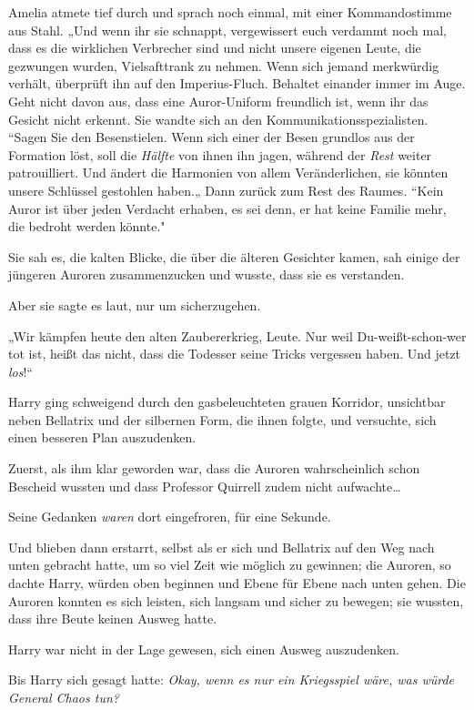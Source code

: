 {Amelia atmete tief durch und sprach noch einmal, mit einer Kommandostimme aus Stahl. „Und wenn ihr sie schnappt, vergewissert euch verdammt noch mal, dass es die wirklichen Verbrecher sind und nicht unsere eigenen Leute, die gezwungen wurden, Vielsafttrank zu nehmen. Wenn sich jemand merkwürdig verhält, überprüft ihn auf den Imperius-Fluch. Behaltet einander immer im Auge. Geht nicht davon aus, dass eine Auror-Uniform freundlich ist, wenn ihr das Gesicht nicht erkennt. Sie wandte sich an den Kommunikationsspezialisten. “Sagen Sie den Besenstielen. Wenn sich einer der Besen grundlos aus der Formation löst, soll die \emph{Hälfte} von ihnen ihn jagen, während der \emph{Rest} weiter patrouilliert. Und ändert die Harmonien von allem Veränderlichen, sie könnten unsere Schlüssel gestohlen haben.„ Dann zurück zum Rest des Raumes. “Kein Auror ist über jeden Verdacht erhaben, es sei denn, er hat keine Familie mehr, die bedroht werden könnte."

Sie sah es, die kalten Blicke, die über die älteren Gesichter kamen, sah einige der jüngeren Auroren zusammenzucken und wusste, dass sie es verstanden.

Aber sie sagte es laut, nur um sicherzugehen.

„Wir kämpfen heute den alten Zaubererkrieg, Leute. Nur weil Du-weißt-schon-wer tot ist, heißt das nicht, dass die Todesser seine Tricks vergessen haben. Und jetzt \emph{los}!“

Harry ging schweigend durch den gasbeleuchteten grauen Korridor, unsichtbar neben Bellatrix und der silbernen Form, die ihnen folgte, und versuchte, sich einen besseren Plan auszudenken.

Zuerst, als ihm klar geworden war, dass die Auroren wahrscheinlich schon Bescheid wussten und dass Professor Quirrell zudem nicht aufwachte…

Seine Gedanken \emph{waren} dort eingefroren, für eine Sekunde.

Und blieben dann erstarrt, selbst als er sich und Bellatrix auf den Weg nach unten gebracht hatte, um so viel Zeit wie möglich zu gewinnen; die Auroren, so dachte Harry, würden oben beginnen und Ebene für Ebene nach unten gehen. Die Auroren konnten es sich leisten, sich langsam und sicher zu bewegen; sie wussten, dass ihre Beute keinen Ausweg hatte.

Harry war nicht in der Lage gewesen, sich einen Ausweg auszudenken.

Bis Harry sich gesagt hatte: \emph{Okay, wenn es nur ein Kriegsspiel wäre, was würde General Chaos tun?}

}
